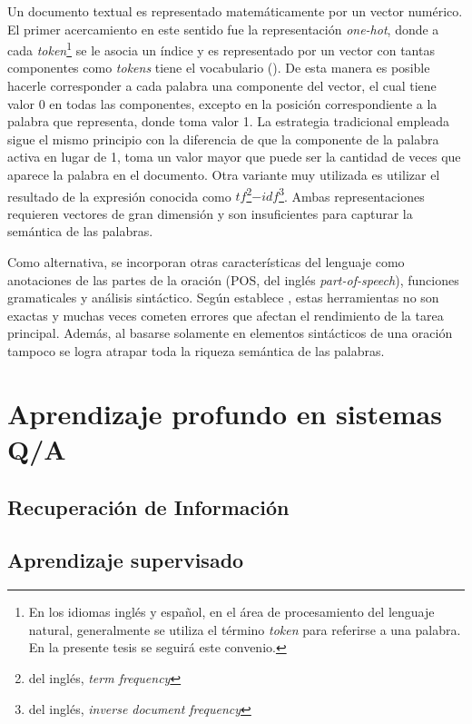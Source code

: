 Un documento textual es representado matemáticamente por un vector numérico. El primer acercamiento en este sentido fue la representación \textit{one-hot}, donde a cada \textit{token}\footnote{En los idiomas inglés y español, en el área de procesamiento del lenguaje natural, generalmente se utiliza el término \textit{token} para referirse a una palabra. En la presente tesis se seguirá este convenio.} se le asocia un índice y es representado por un vector con tantas componentes como \textit{tokens} tiene el vocabulario (\cite{goyal-2018-deepnlp}). De esta manera es posible hacerle corresponder a cada palabra una componente del vector, el cual tiene valor 0 en todas las componentes, excepto en la posición correspondiente a la palabra que representa, donde toma valor 1. La estrategia tradicional empleada sigue el mismo principio con la diferencia de que la componente de la palabra activa en lugar de 1, toma un valor mayor que puede ser la cantidad de veces que aparece la palabra en el documento. Otra variante muy utilizada es utilizar el resultado de la expresión conocida como $tf$\footnote{del inglés, \textit{term frequency}}$-idf$\footnote{del inglés, \textit{inverse document frequency}}. Ambas representaciones requieren vectores de gran dimensión y son insuficientes para capturar la semántica de las palabras.

Como alternativa, se incorporan otras características del lenguaje como anotaciones de las partes de la oración (POS, del inglés \textit{part-of-speech}), funciones gramaticales y análisis sintáctico. Según establece \cite{chollet-2017-deeplearningpython}, estas herramientas no son exactas y muchas veces cometen errores que afectan el rendimiento de la tarea principal. Además, al basarse solamente en elementos sintácticos de una oración tampoco se logra atrapar toda la riqueza semántica de las palabras.


\section{Aprendizaje profundo en sistemas Q/A}


\subsection{Recuperación de Información}


\subsection{Aprendizaje supervisado}